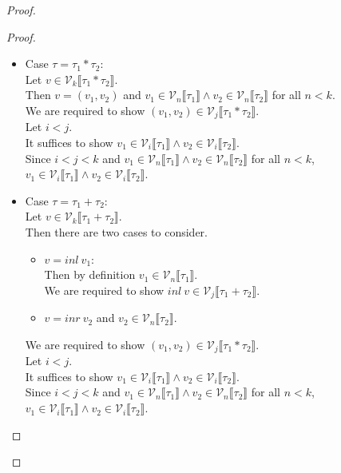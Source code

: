 \documentclass{article}
\begin{document}
\begin{proof}
\begin{proof}
\begin{itemize}
  \item Case $\tau = \tau_1 * \tau_2$:\\
    Let $v \in \mathcal{V}_k \llbracket \tau_1 * \tau_2 \rrbracket$.\\
    Then $v = (v_1, v_2)$ and $v_1 \in \mathcal{V}_n \llbracket \tau_1 \rrbracket \wedge v_2 \in \mathcal{V}_n \llbracket \tau_2 \rrbracket$ for all $n < k$.\\
    We are required to show $(v_1, v_2) \in \mathcal{V}_j \llbracket \tau_1 * \tau_2 \rrbracket$.\\
    Let $i < j$.\\
    It suffices to show $v_1 \in \mathcal{V}_i \llbracket \tau_1 \rrbracket \wedge v_2 \in \mathcal{V}_i \llbracket \tau_2 \rrbracket$.\\
    Since $i < j < k$ and $v_1 \in \mathcal{V}_n \llbracket \tau_1 \rrbracket \wedge v_2 \in \mathcal{V}_n \llbracket \tau_2 \rrbracket$ for all $n < k$, $v_1 \in \mathcal{V}_i \llbracket \tau_1 \rrbracket \wedge v_2 \in \mathcal{V}_i \llbracket \tau_2 \rrbracket$.\\

  \item Case $\tau = \tau_1 + \tau_2$:\\
    Let $v \in \mathcal{V}_k \llbracket \tau_1 + \tau_2 \rrbracket$.\\
    Then there are two cases to consider.
    \begin{itemize}
    \item $v = inl~v_1$:\\
      Then by definition $v_1 \in \mathcal{V}_n \llbracket \tau_1 \rrbracket$.\\
      We are required to show $inl~v \in \mathcal{V}_j \llbracket \tau_1 + \tau_2 \rrbracket$.\\
      
       
    \item $v = inr~v_2$ and $v_2 \in \mathcal{V}_n \llbracket \tau_2 \rrbracket$.\\
    \end{itemize}

    
    
    We are required to show $(v_1, v_2) \in \mathcal{V}_j \llbracket \tau_1 * \tau_2 \rrbracket$.\\
    Let $i < j$.\\
    It suffices to show $v_1 \in \mathcal{V}_i \llbracket \tau_1 \rrbracket \wedge v_2 \in \mathcal{V}_i \llbracket \tau_2 \rrbracket$.\\
    Since $i < j < k$ and $v_1 \in \mathcal{V}_n \llbracket \tau_1 \rrbracket \wedge v_2 \in \mathcal{V}_n \llbracket \tau_2 \rrbracket$ for all $n < k$, $v_1 \in \mathcal{V}_i \llbracket \tau_1 \rrbracket \wedge v_2 \in \mathcal{V}_i \llbracket \tau_2 \rrbracket$.\\
    

\end{itemize}
\end{proof}
\end{proof}
\end{document}
